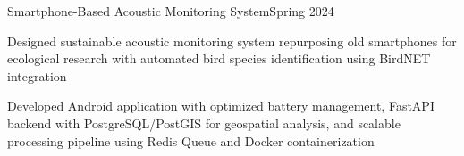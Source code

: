 \begin{joblong}{Smartphone-Based Acoustic Monitoring System}{Spring 2024}
	\item Designed sustainable acoustic monitoring system repurposing old smartphones for ecological research with automated bird species identification using BirdNET integration
	\item Developed Android application with optimized battery management, FastAPI backend with PostgreSQL/PostGIS for geospatial analysis, and scalable processing pipeline using Redis Queue and Docker containerization
\end{joblong}
